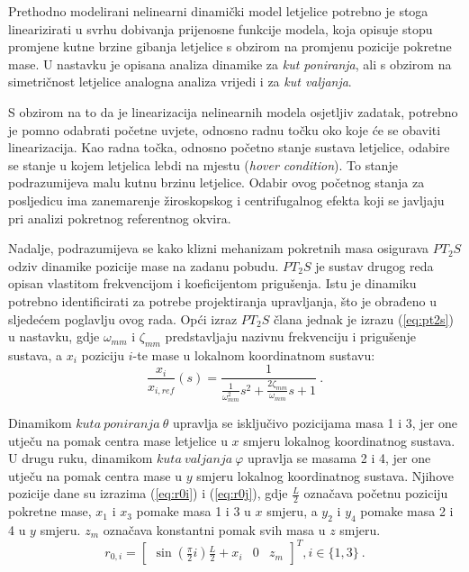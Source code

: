 \documentclass[11pt,a4paper]{article}
\begin{document}
\medskip

Prethodno modelirani nelinearni dinamički model letjelice potrebno je stoga linearizirati u svrhu dobivanja prijenosne funkcije modela, koja opisuje stopu promjene kutne brzine gibanja letjelice s obzirom na promjenu pozicije pokretne mase. U nastavku je opisana analiza dinamike za \textit{kut poniranja}, ali s obzirom na simetričnost letjelice analogna analiza vrijedi i za \textit{kut valjanja}. 

\medskip

S obzirom na to da je linearizacija nelinearnih modela osjetljiv zadatak, potrebno je pomno odabrati početne uvjete, odnosno radnu točku oko koje će se obaviti linearizacija. Kao radna točka, odnosno početno stanje sustava letjelice, odabire se stanje u kojem letjelica lebdi na mjestu (\textit{hover condition}). To stanje podrazumijeva malu kutnu brzinu letjelice. Odabir ovog početnog stanja za posljedicu ima zanemarenje žiroskopskog i centrifugalnog efekta koji se javljaju pri analizi pokretnog referentnog okvira. 

\medskip

Nadalje, podrazumijeva se kako klizni mehanizam pokretnih masa osigurava $PT_{2}S$ odziv dinamike pozicije mase na zadanu pobudu. $PT_{2}S$ je sustav drugog reda opisan vlastitom frekvencijom i koeficijentom prigušenja. Istu je dinamiku potrebno identificirati za potrebe projektiranja upravljanja, što je obrađeno u sljedećem poglavlju ovog rada. Opći izraz $PT_{2}S$ člana jednak je izrazu (\ref{eq:pt2s}) u nastavku, gdje $\omega_{mm}$ i $\zeta_{mm}$ predstavljaju nazivnu frekvenciju i prigušenje sustava, a $x_{i}$ poziciju $i$-te mase u lokalnom koordinatnom sustavu:
\begin{equation}
\frac{x_{i}}{x_{i, ref}}(s) = \frac{1}{\frac{1}{\omega_{mm}^{2}}s^{2} + \frac{2\zeta_{mm}}{\omega_{mm}}s + 1 } \ .
\label{eq:pt2s}
\end{equation}

Dinamikom $kuta \ poniranja \ \theta$ upravlja se isključivo pozicijama masa 1 i 3, jer one utječu na pomak centra mase letjelice u $x$ smjeru lokalnog koordinatnog sustava. U drugu ruku, dinamikom $kuta \ valjanja \ \varphi$ upravlja se masama 2 i 4, jer one utječu na pomak centra mase u $y$ smjeru lokalnog koordinatnog sustava. Njihove pozicije dane su izrazima (\ref{eq:r0i}) i (\ref{eq:r0j}), gdje $\frac{L}{2}$ označava početnu poziciju pokretne mase, $x_{1}$ i $x_{3}$ pomake masa 1 i 3 u $x$ smjeru, a $y_{2}$ i $y_{4}$ pomake masa 2 i 4 u $y$ smjeru. $z_{m}$ označava konstantni pomak svih masa u $z$ smjeru.
\begin{equation}
r_{0,i} = \left[
\begin{matrix}
\sin\left(\frac{\pi}{2}i\right)\frac{L}{2} + x_{i} & 0 & z_{m}
\end{matrix} \right] ^{T}, i \in \{ 1, 3\} \ .
\label{eq:r0i}
\end{equation}
\end{document}
